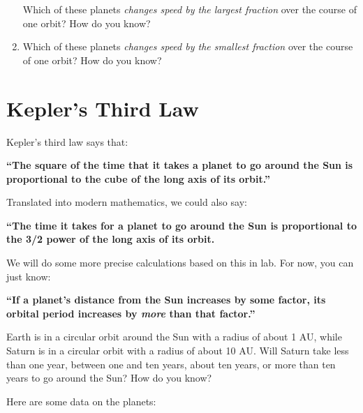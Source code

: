 \documentclass[12pt]{article}
\begin{document}
\begin{enumerate}
Which of these planets {\it changes speed by the largest fraction} over the course of one orbit? How do you know?

\vspace{1in}

\item Which of these planets {\it changes speed by the smallest fraction} over the course of one orbit? How do you know?


\end{enumerate}

\newpage

\section{Kepler's Third Law}

Kepler's third law says that:

\begin{center}
	
	\bf ``The square of the time that it takes a planet to go around the Sun is proportional to the cube of the long axis of its orbit.''
\end{center}

Translated into modern mathematics, we could also say:

\begin{center}
	
	\bf ``The time it takes for a planet to go around the Sun is proportional to the 3/2 power of the long axis of its orbit.
\end{center}

We will do some more precise calculations based on this in lab. For now, you can just know:

\begin{center}
	\bf ``If a planet's distance from the Sun increases by some factor, its orbital period increases by {\it more} than that factor.''
\end{center}




	Earth is in a circular orbit around the Sun with a radius of about 1 AU, while Saturn is in a circular orbit with a radius of about 10 AU. Will Saturn take less than one year, between one and ten years, about ten years, or more than ten years to go around the Sun? How do you know?



\newpage

Here are some data on the planets:
\end{document}
